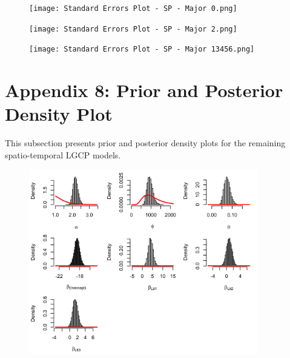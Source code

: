     \begin{figure}[H]
        \begin{center}
            \texttt{[image: Standard Errors Plot - SP - Major 0.png]}
        \end{center}
    \end{figure}

    \begin{figure}[H]
        \begin{center}
            \texttt{[image: Standard Errors Plot - SP - Major 2.png]}
        \end{center}
    \end{figure}

    \begin{figure}[H]
        \begin{center}
            \texttt{[image: Standard Errors Plot - SP - Major 13456.png]}
        \end{center}
    \end{figure}

    \newpage


\section*{Appendix 8: Prior and Posterior Density Plot} \label{app:density-plot}

    This subsection presents prior and posterior density plots for the remaining spatio-temporal LGCP models.

    \begin{figure}[H]
        \begin{center}
            \includegraphics[width = \linewidth, height = 80mm]{Prior and posterior density plots - All Cases.png}
        \end{center}
    \end{figure}

